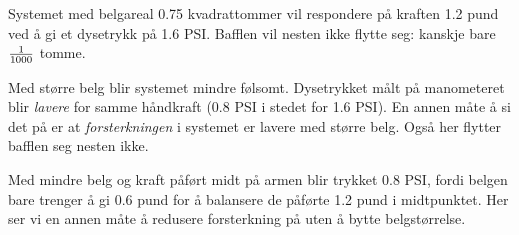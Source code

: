 





Systemet med belgareal 0.75 kvadrattommer vil respondere på kraften 1.2 pund ved å gi et dysetrykk på 1.6 PSI.  Bafflen vil nesten ikke flytte seg: kanskje bare $1 \over 1000$ tomme.

\vskip 10pt

Med større belg blir systemet mindre følsomt.  Dysetrykket målt på manometeret blir \textit{lavere} for samme håndkraft (0.8 PSI i stedet for 1.6 PSI).  En annen måte å si det på er at \textit{forsterkningen} i systemet er lavere med større belg.  Også her flytter bafflen seg nesten ikke.

\vskip 10pt

Med mindre belg og kraft påført midt på armen blir trykket 0.8 PSI, fordi belgen bare trenger å gi 0.6 pund for å balansere de påførte 1.2 pund i midtpunktet.  Her ser vi en annen måte å redusere forsterkning på uten å bytte belgstørrelse.










